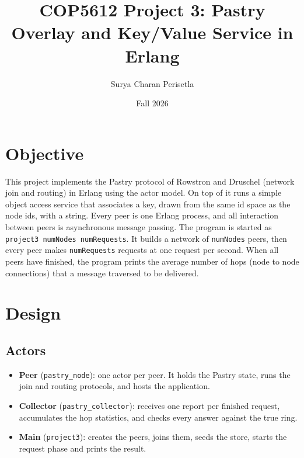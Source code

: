\documentclass[10pt]{article}
\title{\textbf{COP5612 Project 3: Pastry Overlay and Key/Value Service in Erlang}}
\author{Surya Charan Perisetla}
\date{Fall 2026}
\begin{document}
\maketitle

\section{Objective}
This project implements the Pastry protocol of Rowstron and Druschel (network join and routing) in Erlang using the actor model.
On top of it runs a simple object access service that associates a key, drawn from the same id space as the node ids, with a string.
Every peer is one Erlang process, and all interaction between peers is asynchronous message passing.
The program is started as \texttt{project3 numNodes numRequests}.
It builds a network of \texttt{numNodes} peers, then every peer makes \texttt{numRequests} requests at one request per second.
When all peers have finished, the program prints the average number of hops (node to node connections) that a message traversed to be delivered.

\section{Design}
\subsection{Actors}
\begin{itemize}
  \item \textbf{Peer} (\texttt{pastry\_node}): one actor per peer. It holds the Pastry state, runs the join and routing protocols, and hosts the application.
  \item \textbf{Collector} (\texttt{pastry\_collector}): receives one report per finished request, accumulates the hop statistics, and checks every answer against the true ring.
  \item \textbf{Main} (\texttt{project3}): creates the peers, joins them, seeds the store, starts the request phase and prints the result.
\end{itemize}
\end{document}
